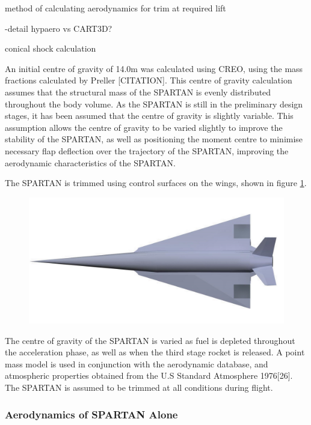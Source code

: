 		
		
		
		method of calculating aerodynamics for trim at required lift
		
		-detail hypaero vs CART3D? 
		
		
		conical shock calculation
		
An initial centre of gravity of 14.0m was calculated using CREO, using the mass fractions calculated by Preller [CITATION]. This centre of gravity calculation assumes that the structural mass of the SPARTAN is evenly distributed throughout the body volume. As the SPARTAN is still in the preliminary design stages, it has been assumed that the centre of gravity is slightly variable. This assumption allows the centre of gravity to be varied slightly to improve the stability of the SPARTAN, as well as positioning the moment centre to minimise necessary flap deflection over the trajectory of the SPARTAN, improving the aerodynamic characteristics of the SPARTAN. 

The SPARTAN is trimmed using control surfaces on the wings, shown in figure \ref{fig:SPARTAN_FLAPS}. 

\begin{figure}
\centering
\includegraphics[width=0.7\linewidth]{figures/3_vehicle_design/SPARTAN_FLAPS}
\caption{}
\label{fig:SPARTAN_FLAPS}
\end{figure}


The centre of gravity of the SPARTAN is varied as fuel is depleted throughout the acceleration phase, as well as when the third stage rocket is released. A point mass model is used in conjunction with the aerodynamic database,
and atmospheric properties obtained from the U.S Standard Atmosphere 1976[26]. The SPARTAN is assumed to be
trimmed at all conditions during flight.






  \subsubsection{Aerodynamics of SPARTAN Alone}
  
